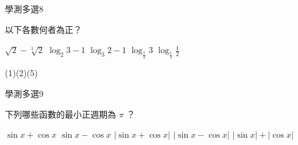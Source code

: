 \begin{QUESTIONS}
\begin{QUESTION}
    \end{QUESTION}
    \begin{QUESTION}
        \begin{ExamInfo}{92}{學測}{多選}{8}
        \end{ExamInfo}
        \begin{ExamAnsRateInfo}{55}{86}{60}{19}
        \end{ExamAnsRateInfo}
        \begin{QBODY}
            以下各數何者為正？ 
            \begin{QOPS} 
                \QOP $\sqrt{2} - \sqrt[3]{2}$ 
                \QOP $\log_{2} 3-1$ 
                \QOP $\log_{3}2 -1$ 
                \QOP $\log_{\frac{1}{2}} 3$ 
                \QOP $\log_{\frac{1}{3}} \frac{1}{2}$ 
            \end{QOPS}
        \end{QBODY}
        \begin{QFROMS}
        \end{QFROMS}
        \begin{QTAGS}\end{QTAGS}
        \begin{QANS}
            (1)(2)(5)
        \end{QANS}
        \begin{QSOLLIST}
        \end{QSOLLIST}
        \begin{QEMPTYSPACE}
        \end{QEMPTYSPACE}
    \end{QUESTION}
    \begin{QUESTION}
        \begin{ExamInfo}{92}{學測}{多選}{9}
        \end{ExamInfo}
        \begin{ExamAnsRateInfo}{24}{42}{19}{11}
        \end{ExamAnsRateInfo}
        \begin{QBODY}
            下列哪些函數的最小正週期為 $\pi$ ？ 
            \begin{QOPS} 
                \QOP $\sin x + \cos x$ 
                \QOP $\sin x - \cos x$ 
                \QOP $|\sin x + \cos x|$
                \QOP $|\sin x - \cos x|$ 
                \QOP $|\sin x| + |\cos x|$
            \end{QOPS}
        \end{QBODY}
        \begin{QFROMS}

\end{QFROMS}
\end{QUESTION}
\end{QUESTIONS}
